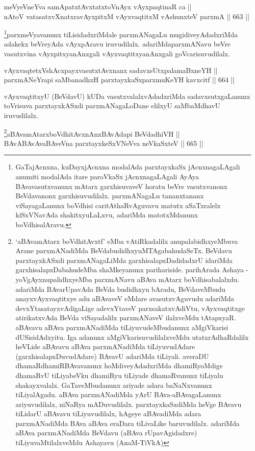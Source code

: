 \begin{shl}
meVyeVneYva samApatxtAvxtatxtoV\s nAyx vAyxpaqtinaR ca || \\
nAtoV vatasatxvXnatxravAyxpitxM vAyxvaqtitxM vA\s shunxteV parxmA \hfill || 663 ||  
\end{shl}

\begin{artha}
\footnote{GaTajAcnxna, kuDayxjAcnxna modalAda parxtayxkaSx jAcnxnagaLAgali anumiti modalAda itare paroVkaSx jAcnxnagaLAgali AyAya BAvavasutxvanunx mAtarx garxhisuvaveV horatu beVre vasutxvanonx BeVdavanonx garxhisuvudilalx. parxmANagaLu tananxtananx viSayagaLanunx boVdhisi caritAthaRvAguvavu matutx aSaTxralelx kiSxVNavAda shakitxyuLaLxvu, adariMda matotxMdanunx boVdhisalAravu.}parxmeVyavanunx tiLisidadxriMdale parxmANagaLu mugidiveyAdadx\-riMda adakekx beVreyAda vAyxpAravu iruvudilalx. adariMda\break parxmANavu beVre vasutxvina vAyxpitxyanAnxgali vAyxvaqtitxyanAnxgali goVcarisuvudilalx.
\end{artha}

\begin{shl}
vAyxvaqtetxVshAcxpayxvasutxtAvxnanx sadavxsUtxpalamaBxneYH || \\
parxmANeYrapi saMbanadhxH parxtayxkaSxparxmuKeYH kavxcitf \hfill || 664 ||  
\end{shl}

\begin{artha}
vAyxvaqtitxyU (BeVdavU) kUDa vasutxvalalxvAdadxriMda 
sadavxsutxgaLanunx toVrisuva parxtayxkASxdi parxmANagaLoDane elilxyU\break
saMbaMdhavU iruvudilalx.
\end{artha}


\begin{shl}
\footnote{`aBAvamAtarx boVdhitAvxtf' eMba vAtiRkadalilx anupalabidhxyeMbuva Arane parxmANadiMda BeVdabudidhxyuMTAgabahudaSeTx.  BeVdavu parxtayxkASxdi parxmANagaLiMda garxhisalapxDadidadxrU idariMda  garxhisalapxDabahudeMba shaMkeyanunx parihariside. parihArada Ashaya - yoVgAyxnupalidhxyeMba parxmANavu aBAva mAtarx boVdhisabalalxdu.  adariMda BAvarUpavAda BeVda budidhxyu bAradu, BeVdaveMbudu anayxvAyxvaqtitxye adu aBAvaveV eMdare avasutxvAguvudu adariMda devxYtasatayxvAdigaLige adevxYtaveV parxsakatxvAdiVtu, vAyxvaqtitxge atirikatxvAda BeVda viSayadalilx parxmANaveV ilalxveMdu tAtapxyaR. aBAvavu aBAva parxmANadiMda tiLiyuvudeMbudanunx aMgiVkarisi dUSisidAdxyitu. Iga adanunx aMgiVkarisuvudilalxveMdu utatxrAdhaRdalilx heVLide \ndash  aBAvavu aBAva parxmANadiMda tiLiyuvudAdare (garxhisalapxDuvudAdare) BAvavU adariMda tiLiyali. averaDU dhamaRdhamiRBAvavanunx hoMdiveyAdadxriMda dhamiRyoMdige dhamaRvU tiLiyabeVku dhamiRyu tiLiyade dhamaRvanunx tiLiyalu shakayxvalalx. GaTaveMbudanunx ariyade adara baNaNxvanunx tiLiyalAgadu. aBAva parxmANadiMda yArU BAva-aBAvagaLanunx ariyuvudilalx, niNaRya mADuvudilalx. parxtayxkaSxdiMda heVge BAvavu tiLidarU aBAvavu tiLiyuvudilalx, hAgeye aBAvadiMda adara parxmANadiMda BAva aBAva eraDara tiLivaLike baruvudilalx. adariMda aBAva parxmANadiMda BeVdavu (aBAva rUpavAgidadxre) tiLiyuvaMtilalxveMdu Ashayavu (AnaM-TiVkA)}aBAvamAtarxboVdhitAvxnAnxBAvAdapi BeVdadhiVH || \\
BAvABAvAvaBAveVna parxtayxkeSxVNeVva neVkaSxteV \hfill || 665 ||  
\end{shl}

